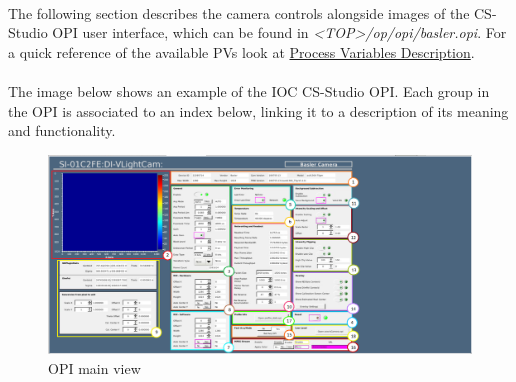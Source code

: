 \documentclass[openany]{article}
\begin{document}
    \paragraph{} The following section describes the camera controls alongside images of the CS-Studio OPI user interface, which can be found in \emph{\textless TOP\textgreater\slash op\slash opi\slash basler.opi}. For a quick reference of the available PVs look at \hyperref[sec:process-variables]{Process Variables Description}.

    \paragraph{} The image below shows an example of the IOC CS-Studio OPI. Each group in the OPI is associated to an index below, linking it to a description of its meaning and functionality.

    \begin{figure}[!h]
        \caption{OPI main view}
        \label{fig:opi-main}
        \centering
        \includegraphics[width=1.0\textwidth]{example_opi_indexes}
    \end{figure}
    \FloatBarrier
\end{document}
